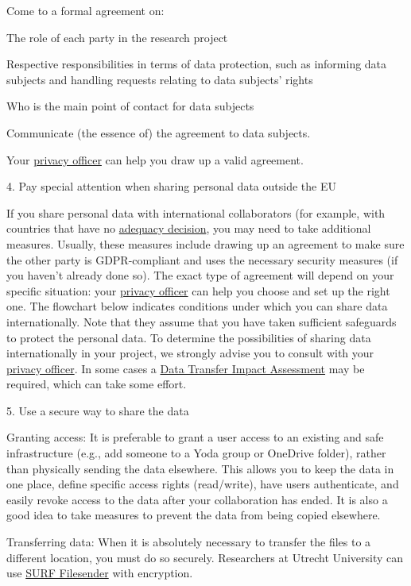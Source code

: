 \documentclass[
]{book}
\begin{document}
Come to a formal agreement on:

The role of each party in the research project

Respective responsibilities in terms of data protection, such as
informing data subjects and handling requests relating to data subjects'
rights

Who is the main point of contact for data subjects

Communicate (the essence of) the agreement to data subjects.

Your \protect\hyperlink{support}{privacy officer} can help you draw up a valid agreement.

4. Pay special attention when sharing personal data outside the EU

If you share personal data with international collaborators (for example,
with countries that have no
\href{https://ec.europa.eu/info/law/law-topic/data-protection/international-dimension-data-protection/adequacy-decisions_en}{adequacy decision},
you may need to take additional measures. Usually, these measures include
drawing up an agreement to make sure the other party is GDPR-compliant and
uses the necessary security measures (if you haven't already done so). The
exact type of agreement will depend on your specific situation: your
\protect\hyperlink{support}{privacy officer} can help you choose and set up the right one.
The flowchart below indicates conditions under which you can share data
internationally. Note that they assume that you have taken sufficient
safeguards to protect the personal data. To determine the possibilities
of sharing data internationally in your project, we strongly advise you
to consult with your \protect\hyperlink{support}{privacy officer}. In some cases a
\protect\hyperlink{dtia}{Data Transfer Impact Assessment} may be required, which can
take some effort.

5. Use a secure way to share the data

Granting access: It is preferable to grant a user access
to an existing and safe infrastructure (e.g., add someone to a Yoda
group or OneDrive folder), rather than physically sending the data
elsewhere. This allows you to keep the data in one place, define
specific access rights (read/write), have users authenticate, and
easily revoke access to the data after your collaboration has ended.
It is also a good idea to take measures to prevent the data from
being copied elsewhere.

Transferring data: When it is absolutely necessary to
transfer the files to a different location, you must do so securely.
Researchers at Utrecht University can use
\href{https://filesender.surf.nl}{SURF Filesender}
with encryption.
\end{document}
